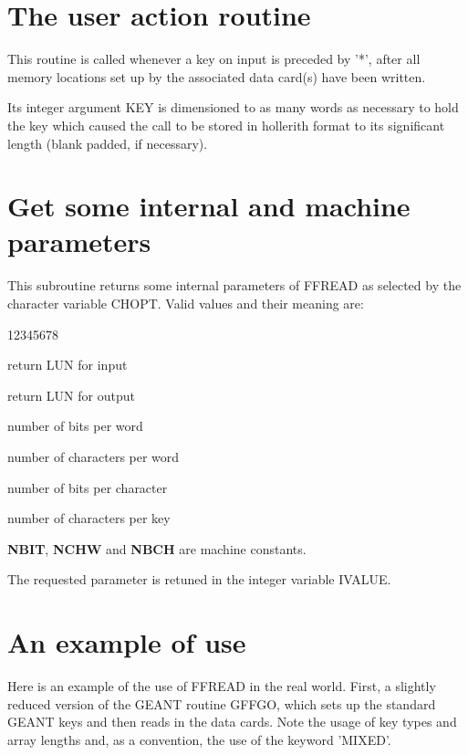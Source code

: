  
\section{The user action routine}
 
 
This routine is called whenever a key on input is preceded by '*', after all
memory locations set up by the associated data card(s) have been written.
 
Its integer argument KEY is dimensioned to as many words as necessary to hold
the key which caused the call to be stored in hollerith format to its
significant length (blank padded, if necessary).
 
\section{Get some internal and machine parameters}
 
 
This subroutine returns some internal parameters of FFREAD as selected by
the character variable CHOPT. Valid values and their meaning are:

\begin{DLtt}{12345678}
\item[LINP]return LUN for input
\item[LOUT]return LUN for output
\item[NBIT]number of bits per word        
\item[NCHW]number of characters per word 
\item[NBCH]number of bits per character 
\item[NCHK]number of characters per key
\end{DLtt}

{\bf NBIT}, {\bf NCHW} and {\bf NBCH} are machine constants.
 
The requested parameter is retuned in the integer variable IVALUE.
 
\section{An example of use}
 
Here is an example of the use of FFREAD in the real world. First, a slightly
reduced version of the GEANT routine GFFGO, which sets up the standard GEANT
keys and then reads in the data cards. Note the usage of key types and array
lengths and, as a convention, the use of the keyword 'MIXED'.
 
